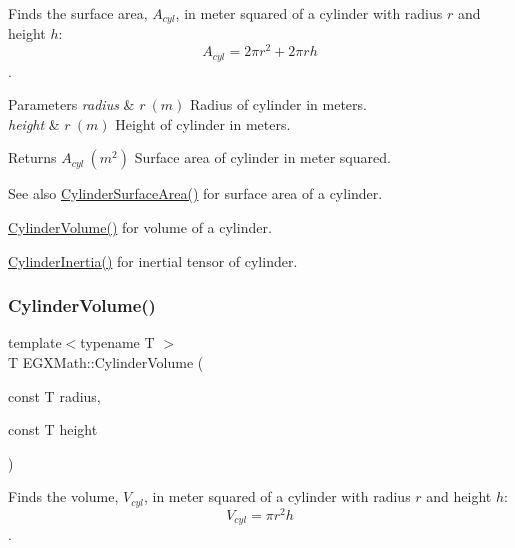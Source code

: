 Finds the surface area, $A_{cyl}$, in meter squared of a cylinder with radius $r$ and height $h$\+: \[ A_{cyl}=2\pi r^2 + 2\pi r h \]. 


\begin{DoxyParams}{Parameters}
{\em radius} & $ r\ (m)$ Radius of cylinder in meters. \\
\hline
{\em height} & $ r\ (m)$ Height of cylinder in meters. \\
\hline
\end{DoxyParams}
\begin{DoxyReturn}{Returns}
$ A_{cyl}\ (m^2)$ Surface area of cylinder in meter squared. 
\end{DoxyReturn}
\begin{DoxySeeAlso}{See also}
\mbox{\hyperlink{group___e_g_x_math-_geometry-_cylinder_gaf14619f5d525e14150a43b9898adb258}{Cylinder\+Surface\+Area()}} for surface area of a cylinder. 

\mbox{\hyperlink{group___e_g_x_math-_geometry-_cylinder_ga9d1aa08f778f9ccbd79953063f11bc9b}{Cylinder\+Volume()}} for volume of a cylinder. 

\mbox{\hyperlink{group___e_g_x_math-_geometry-_cylinder_ga5d9256549303e88a49b72e3d4c2c4a6d}{Cylinder\+Inertia()}} for inertial tensor of cylinder. 
\end{DoxySeeAlso}
\mbox{\label{group___e_g_x_math-_geometry-_cylinder_ga9d1aa08f778f9ccbd79953063f11bc9b}} 
\subsubsection{\texorpdfstring{Cylinder\+Volume()}{CylinderVolume()}}
{\footnotesize\ttfamily template$<$typename T $>$ \\
T E\+G\+X\+Math\+::\+Cylinder\+Volume (\begin{DoxyParamCaption}\item[{const T}]{radius,  }\item[{const T}]{height }\end{DoxyParamCaption})}



Finds the volume, $V_{cyl}$, in meter squared of a cylinder with radius $r$ and height $h$\+: \[ V_{cyl}=\pi r^2 h\]. 


